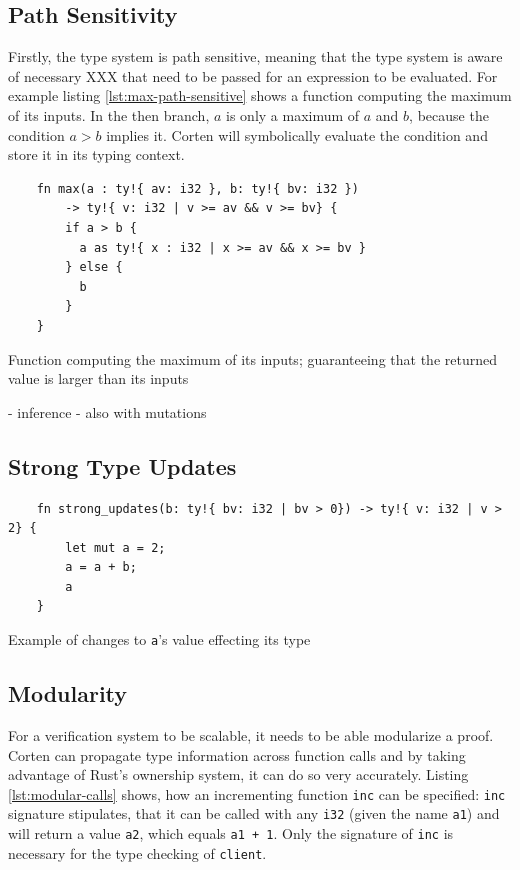 \documentclass{book}
\newcommand{\code}[1]{\texttt{#1}}
\theoremstyle{definition}
\begin{document}
\label{subsec:path-sensitivify}\subsection{Path Sensitivity}

Firstly, the type system is path sensitive, meaning that the type system is aware of necessary XXX that need to be passed for an expression to be evaluated. For example listing \ref{lst:max-path-sensitive} shows a function computing the maximum of its inputs. In the then branch, $a$ is only a maximum of $a$ and $b$, because the condition $a > b$ implies it. Corten will symbolically evaluate the condition and store it in its typing context.

\begin{listing}[h]
  \begin{verbatim}
    fn max(a : ty!{ av: i32 }, b: ty!{ bv: i32 })
        -> ty!{ v: i32 | v >= av && v >= bv} {
        if a > b {
          a as ty!{ x : i32 | x >= av && x >= bv }
        } else {
          b
        }
    }
  \end{verbatim}
  \caption{Function computing the maximum of its inputs; guaranteeing that the returned value is larger than its inputs}
  \label{lst:max-path-sensitive}
\end{listing}


- inference
- also with mutations


\label{subsec:strong-type-updates}\subsection{Strong Type Updates}

\begin{listing}[h]
  \begin{verbatim}
    fn strong_updates(b: ty!{ bv: i32 | bv > 0}) -> ty!{ v: i32 | v > 2} {
        let mut a = 2;
        a = a + b;
        a
    }
  \end{verbatim}
  \caption{Example of changes to \code{a}'s value effecting its type}
  \label{lst:strong-updates}
\end{listing}



\label{sec:modularity}\subsection{Modularity}

For a verification system to be scalable, it needs to be able modularize a proof. Corten can propagate type information across function calls and by taking advantage of Rust's ownership system, it can do so very accurately. Listing \ref{lst:modular-calls} shows, how an incrementing function \code{inc} can be specified: \code{inc} signature stipulates, that it can be called with any \code{i32} (given the name \code{a1}) and will return a value \code{a2}, which equals \code{a1 + 1}. Only the signature of \code{inc} is necessary for the type checking of \code{client}. 
\end{document}
